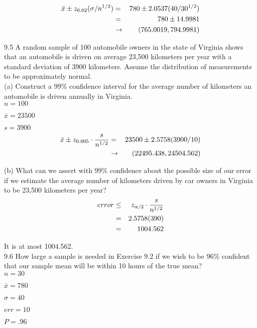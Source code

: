 \begin{eqnarray*}
\bar{x} \pm z_{0.02} (\sigma/n^{1/2}) 
& = & 780 \pm 2.0537(40/30^{1/2}) \\
& = & 780 \pm 14.9981 \\
& \rightarrow & (765.0019, 794.9981)
\end{eqnarray*}


9.5 A random sample of 100 automobile owners in the state of Virginia shows that an automobile is driven on average 23,500 kilometers per year with a standard deviation of 3900 kilometers. Assume the distribution of measurements to be approximately normal. \\

(a) Construct a 99\% confidence interval for the average number of kilometers an automobile is driven
annually in Virginia. \\

$n = 100$ 

$\bar{x} = 23500$

$s = 3900$ \\


\begin{eqnarray*}
\bar{x} \pm z_{0.005} \cdot \frac{s}{n^{1/2}} 
& = & 23500 \pm 2.5758 (3900/10) \\
& \rightarrow & (22495.438 , 24504.562)
\end{eqnarray*}

(b) What can we assert with 99\% confidence about the possible size of our error if we estimate the average number of kilometers driven by car owners in Virginia to be 23,500 kilometers per year? \\

\begin{eqnarray*}
error &\leq& z_{\alpha/2} \cdot \frac{s}{n^{1/2}} \\
& = & 2.5758 (390) \\
& = & 1004.562
\end{eqnarray*}

It is at most 1004.562. \\

9.6 How large a sample is needed in Exercise 9.2 if we
wish to be 96\% confident that our sample mean will be
within 10 hours of the true mean? \\

$n = 30$ 

$\bar{x} = 780$

$\sigma = 40$ 

$err = 10$

$P = .96$ \\

